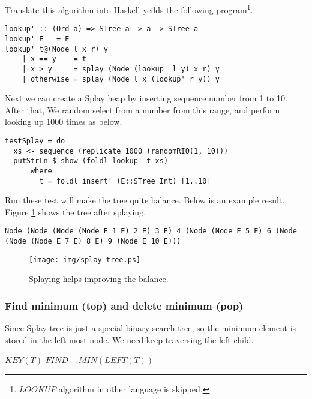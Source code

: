 \documentclass{article}
\begin{document}
Translate this algorithm into Haskell yeilds the following program\footnote{$LOOKUP$ algorithm in other language is skipped.}.

\lstset{language=Haskell}
\begin{lstlisting}
lookup' :: (Ord a) => STree a -> a -> STree a
lookup' E _ = E
lookup' t@(Node l x r) y
    | x == y    = t
    | x > y     = splay (Node (lookup' l y) x r) y
    | otherwise = splay (Node l x (lookup' r y)) y
\end{lstlisting}

Next we can create a Splay heap by inserting sequence number from
1 to 10. After that, We random select from a number from this range,
and perform looking up 1000 times as below.

\begin{lstlisting}
testSplay = do
  xs <- sequence (replicate 1000 (randomRIO(1, 10)))
  putStrLn $ show (foldl lookup' t xs)
      where 
        t = foldl insert' (E::STree Int) [1..10]
\end{lstlisting} %

Run these test will make the tree quite balance. Below is an example
result. Figure \ref{fig:splay-result} shows the tree after splaying.

\begin{verbatim}
Node (Node (Node (Node E 1 E) 2 E) 3 E) 4 (Node (Node E 5 E) 6 (Node 
(Node (Node E 7 E) 8 E) 9 (Node E 10 E)))
\end{verbatim}

\begin{figure}[htbp]
   \begin{center}
   	  \texttt{[image: img/splay-tree.ps]}
          \caption{Splaying helps improving the balance.} \label{fig:splay-result}
   \end{center}
\end{figure}


\subsubsection{Find minimum (top) and delete minimum (pop)}
Since Splay tree is just a special binary search tree, so the minimum
element is stored in the left most node. We need keep traversing
the left child.

\begin{algorithmic}[1]
    \State \Return $KEY(T)$
  \Else
    \State \Return $FIND-MIN(LEFT(T))$
  \EndIf
\EndFunction
\end{algorithmic}
\end{document}
